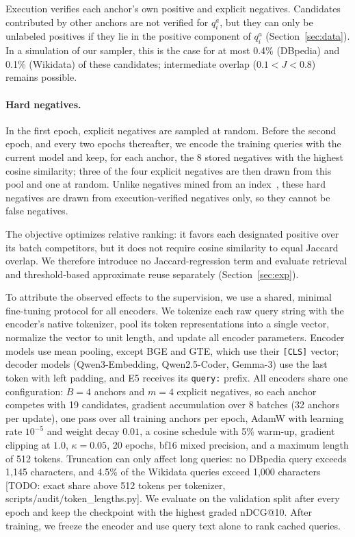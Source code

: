 \documentclass[runningheads]{llncs}
\newcommand{\hp}[1]{{\color{red!75!black}#1}}
\begin{document}
Execution verifies each anchor's own positive and explicit negatives.
Candidates contributed by other anchors are not verified for $q_i^a$, but
they can only be unlabeled positives if they lie in the positive component
of $q_i^a$ (Section~\ref{sec:data}). In a simulation of our sampler, this is
the case for at most 0.4\% (DBpedia) and 0.1\% (Wikidata) of these
candidates; intermediate overlap ($0.1<J<0.8$) remains possible.

\paragraph{Hard negatives.} In the first epoch, explicit negatives are
sampled at random. Before the second epoch, and every two epochs
thereafter, we encode the training queries with the current model and keep,
for each anchor, the 8 stored negatives with the highest cosine similarity;
three of the four explicit negatives are then drawn from this pool and one
at random. Unlike negatives mined from an index~\cite{xiong2021ance}, these
hard negatives are drawn from execution-verified negatives only, so they
cannot be false negatives.

The objective optimizes relative ranking: it favors each designated
positive over its batch competitors, but it does not require cosine
similarity to equal Jaccard overlap. We therefore introduce no
Jaccard-regression term and evaluate retrieval and threshold-based
approximate reuse separately (Section~\ref{sec:exp}).

To attribute the observed effects to the supervision, we use a shared,
minimal fine-tuning protocol for all encoders. We tokenize each raw query
string with the encoder's native tokenizer, pool its token representations
into a single vector, normalize the vector to unit length, and update all
encoder parameters.
Encoder models use mean pooling, except BGE and GTE, which use their
\texttt{[CLS]} vector; decoder models (Qwen3-Embedding, Qwen2.5-Coder,
Gemma-3) use the last token with left padding, and E5 receives its
\texttt{query:} prefix. All encoders share one configuration: $B=4$ anchors and $m=4$ explicit
negatives, so each anchor competes with 19 candidates, gradient accumulation
over 8 batches (32 anchors per update), one pass over all training anchors
per epoch, AdamW with
learning rate $10^{-5}$ and weight decay $0.01$, a cosine schedule with 5\%
warm-up, gradient clipping at $1.0$, $\kappa = 0.05$, 20 epochs, bf16 mixed
precision, and a maximum length of 512 tokens. Truncation can only affect long queries: no DBpedia query exceeds 1{,}145
characters, and 4.5\% of the Wikidata queries exceed 1{,}000 characters
\hp{[TODO: exact share above 512 tokens per tokenizer, scripts/audit/token\_lengths.py]}. We evaluate on the validation split after every
epoch and keep the checkpoint with the highest graded nDCG@10.
After training, we freeze the encoder and use query text alone to
rank cached queries.
\end{document}
